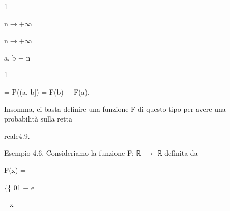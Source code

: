 \documentclass[a4paper,portrait,12pt]{article}
\begin{document}
1





\begin{flushleft}
n$\rightarrow$+$\infty$
\end{flushleft}





\begin{flushleft}
n$\rightarrow$+$\infty$
\end{flushleft}





\begin{flushleft}
a, b + n
\end{flushleft}


1





\begin{flushleft}
= P((a, b]) = F(b) $-$ F(a).
\end{flushleft}





\begin{flushleft}
Insomma, ci basta definire una funzione F di questo tipo per avere una probabilit\`{a} sulla retta
\end{flushleft}


\begin{flushleft}
reale4.9.
\end{flushleft}


\begin{flushleft}
Esempio 4.6. Consideriamo la funzione F: ℝ $\rightarrow$ ℝ definita da
\end{flushleft}


\begin{flushleft}
F(x) =
\end{flushleft}





\begin{flushleft}
\{\{ 01 $-$ e
\end{flushleft}





\begin{flushleft}
$-$x
\end{flushleft}
\end{document}
